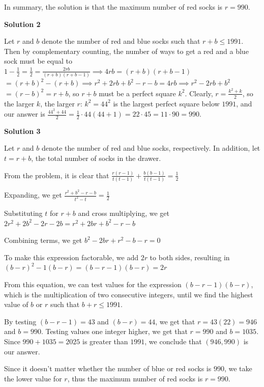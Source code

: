 \begin{enumerate}
 In summary, the solution is that the maximum number of red socks is $r=\boxed{990}$.

 



\textbf{Solution 2}

Let $r$ and $b$ denote the number of red and blue socks such that $r+b\le1991$. Then by complementary counting, the number of ways to get a red and a blue sock must be equal to $1-\frac12=\frac12=\frac{2rb}{(r+b)(r+b-1)}\implies4rb=(r+b)(r+b-1)$$=(r+b)^2-(r+b)\implies r^2+2rb+b^2-r-b=4rb\implies r^2-2rb+b^2$$=(r-b)^2=r+b$, so $r+b$ must be a perfect square $k^2$. Clearly, $r=\frac{k^2+k}2$, so the larger $k$, the larger $r$: $k^2=44^2$ is the largest perfect square below $1991$, and our answer is $\frac{44^2+44}2=\frac12\cdot44(44+1)=22\cdot45=11\cdot90=\boxed{990}$.

 


 



\textbf{Solution 3}

Let $r$ and $b$ denote the number of red and blue socks, respectively. In addition, let $t = r + b$, the total number of socks in the drawer.

 From the problem, it is clear that $\frac{r(r-1)}{t(t-1)} + \frac{b(b-1)}{t(t-1)} = \frac{1}{2}$

 Expanding, we get $\frac{r^2 + b^2 - r - b}{t^2 - t} = \frac{1}{2}$

 Substituting $t$ for $r + b$ and cross multiplying, we get $2r^2 + 2b^2 - 2r - 2b = r^2 + 2br + b^2 - r - b$

 Combining terms, we get $b^2 - 2br + r^2 - b - r = 0$

 To make this expression factorable, we add $2r$ to both sides, resulting in $(b - r)^2 - 1(b-r) = (b - r - 1)(b - r) = 2r$

 From this equation, we can test values for the expression $(b - r - 1)(b - r)$, which is the multiplication of two consecutive integers, until we find the highest value of $b$ or $r$ such that $b + r \leq 1991$. 

 By testing $(b - r - 1) = 43$ and $(b - r) = 44$, we get that $r = 43(22) = 946$ and $b = 990$. Testing values one integer higher, we get that $r = 990$ and $b = 1035$. Since $990 + 1035 = 2025$ is greater than $1991$, we conclude that $(946, 990)$ is our answer. 

 Since it doesn't matter whether the number of blue or red socks is $990$, we take the lower value for $r$, thus the maximum number of red socks is $r=\boxed{990}$.


\end{enumerate}
